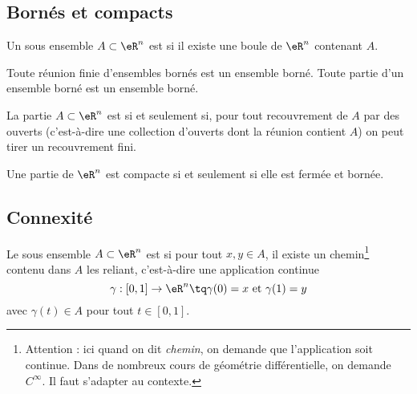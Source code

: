 					\subsection{Bornés et compacts}


\begin{definition}
  Un sous ensemble $A \subset \eR^n$ est  si il existe une boule de $\eR^n$ contenant $A$.
\end{definition}

\begin{proposition}
  Toute réunion finie d'ensembles bornés est un ensemble borné. Toute
  partie d'un ensemble borné est un ensemble borné.
\end{proposition}

\begin{definition}
  La partie $A \subset \eR^n$ est  si et seulement si, pour tout
  recouvrement de $A$ par des ouverts (c'est-à-dire une collection
  d'ouverts dont la réunion contient $A$) on peut tirer un
  recouvrement fini.
\end{definition}


\begin{proposition}
Une partie de $\eR^n$ est compacte si et seulement si elle est fermée et bornée.
\end{proposition}

					\subsection{Connexité}

\begin{definition}
  Le sous ensemble $A \subset \eR^n$ est  si pour tout $x, y \in
  A$, il existe un chemin\footnote{Attention : ici quand on dit \emph{chemin}, on demande que l'application soit continue. Dans de nombreux cours de géométrie différentielle, on demande $ C^{\infty}$. Il faut s'adapter au contexte.} contenu dans $A$ les reliant, c'est-à-dire
  une application continue
  \begin{equation*}
    \gamma : [0,1] \to \eR^n \tq \gamma(0) = x~\text{et}~\gamma(1) = y
  \end{equation*}
  avec $\gamma(t) \in A$ pour tout $t\in [0,1]$.
\end{definition}

